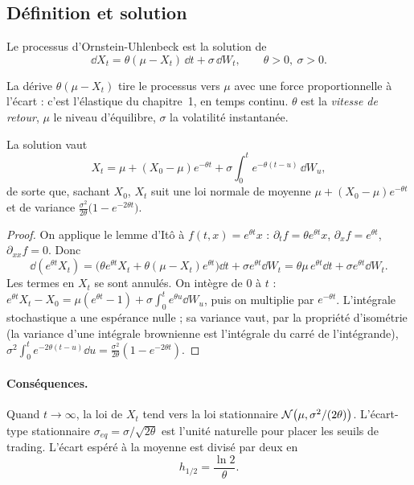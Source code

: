 \subsection{Définition et solution}

\begin{definition}
Le processus d'Ornstein-Uhlenbeck est la solution de
\[
\dd X_t = \theta(\mu - X_t)\,\dd t + \sigma\,\dd W_t, \qquad \theta>0,\ \sigma>0.
\]
\end{definition}

La dérive $\theta(\mu - X_t)$ tire le processus vers $\mu$ avec une force proportionnelle à l'écart : c'est l'élastique du chapitre~1, en temps continu. $\theta$ est la \emph{vitesse de retour}, $\mu$ le niveau d'équilibre, $\sigma$ la volatilité instantanée.

\begin{proposition}\label{c5:prop:sol}
La solution vaut
\[
X_t = \mu + (X_0-\mu)e^{-\theta t} + \sigma\int_0^t e^{-\theta(t-u)}\,\dd W_u,
\]
de sorte que, sachant $X_0$, $X_t$ suit une loi normale de moyenne $\mu + (X_0-\mu)e^{-\theta t}$ et de variance $\frac{\sigma^2}{2\theta}\big(1-e^{-2\theta t}\big)$.
\end{proposition}
\begin{proof}
On applique le lemme d'Itô à $f(t,x) = e^{\theta t}x$ : $\partial_t f = \theta e^{\theta t}x$, $\partial_x f = e^{\theta t}$, $\partial_{xx}f = 0$. Donc
\[
\dd(e^{\theta t}X_t) = \big(\theta e^{\theta t}X_t + \theta(\mu - X_t)e^{\theta t}\big)\dd t + \sigma e^{\theta t}\dd W_t = \theta\mu\,e^{\theta t}\dd t + \sigma e^{\theta t}\dd W_t.
\]
Les termes en $X_t$ se sont annulés. On intègre de 0 à $t$ : $e^{\theta t}X_t - X_0 = \mu(e^{\theta t} - 1) + \sigma\int_0^t e^{\theta u}\dd W_u$, puis on multiplie par $e^{-\theta t}$. L'intégrale stochastique a une espérance nulle ; sa variance vaut, par la propriété d'isométrie (la variance d'une intégrale brownienne est l'intégrale du carré de l'intégrande), $\sigma^2\int_0^t e^{-2\theta(t-u)}\dd u = \frac{\sigma^2}{2\theta}(1-e^{-2\theta t})$.
\end{proof}

\paragraph{Conséquences.} Quand $t\to\infty$, la loi de $X_t$ tend vers la loi stationnaire $\mathcal{N}\big(\mu, \sigma^2/(2\theta)\big)$. L'écart-type stationnaire $\sigma_{eq} = \sigma/\sqrt{2\theta}$ est l'unité naturelle pour placer les seuils de trading. L'écart espéré à la moyenne est divisé par deux en
\[
h_{1/2} = \frac{\ln 2}{\theta}.
\]

